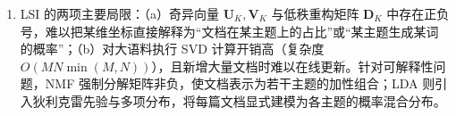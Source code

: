 \begin{exercise}[title={LSI 截断 SVD 重构误差计算与折叠投影证明},level=advanced,points=20,tags={LSI,奇异值分解,低秩近似}]
\begin{solution}
\begin{enumerate}
  \[
    \mathbf{U}_K^\top \mathbf{d}_n
    = [\mathbf{I}_K \;\; \mathbf{0}]\,
      \begin{bmatrix}\boldsymbol{\Sigma}_K & \mathbf{0}\\ \mathbf{0} & \boldsymbol{\Sigma}_{\perp}\end{bmatrix}
      \begin{bmatrix}\mathbf{V}_K^\top \\ \mathbf{V}_{\perp}^\top\end{bmatrix}\mathbf{e}_n
    = \boldsymbol{\Sigma}_K \mathbf{V}_K^\top \mathbf{e}_n.
  \]
  两边左乘 $\boldsymbol{\Sigma}_K^{-1}$ 即得
  \[
    \hat{\mathbf{d}}_n = \boldsymbol{\Sigma}_K^{-1}\mathbf{U}_K^\top \mathbf{d}_n = \mathbf{V}_K^\top \mathbf{e}_n,
  \]
  其正好是 $\mathbf{V}_K^\top$ 的第 $n$ 列，亦即 $\mathbf{V}_K$ 第 $n$ 行的转置。这说明折叠投影与已有文档的隐空间坐标完全自洽。
  \item LSI 的两项主要局限：（a）奇异向量 $\mathbf{U}_K, \mathbf{V}_K$ 与低秩重构矩阵 $\mathbf{D}_K$ 中存在正负号，难以把某维坐标直接解释为“文档在某主题上的占比”或“某主题生成某词的概率”；（b）对大语料执行 SVD 计算开销高（复杂度 $O(MN\min(M,N))$），且新增大量文档时难以在线更新。针对可解释性问题，NMF 强制分解矩阵非负，使文档表示为若干主题的加性组合；LDA 则引入狄利克雷先验与多项分布，将每篇文档显式建模为各主题的概率混合分布。
\end{enumerate}
\end{solution}
\end{exercise}

